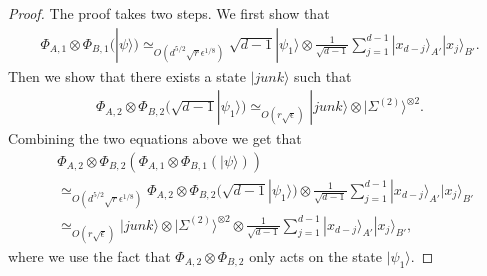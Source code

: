 \documentclass[11pt,letterpaper]{article}
\newcommand{\ket}[1]{|#1\rangle}
\newcommand{\x}{\otimes}
\newcommand{\1}{\mathbb{1}}
\newcommand{\EPR}[1]{\Sigma^{(#1)}}
\newcommand{\ep}{\epsilon}
\newcommand{\se}{\sqrt{\epsilon}}
\newcommand{\sr}{\sqrt{r}}
\newcommand{\appd}[1]{\simeq_{#1}}
\theoremstyle{definition}
\begin{document}
\begin{proof}
The proof takes two steps. 
We first show that 
\begin{align}
	\Phi_{A,1}\x\Phi_{B,1}(\ket{\psi}) \appd{O(d^{5/2} \sr \ep^{1/8})} \sqrt{d-1}\ket{\psi_1} \x \frac{1}{\sqrt{d-1}}\sum_{j=1}^{d-1} \ket{x_{d-j}}_{A'}\ket{x_j}_{B'}.
\end{align}
Then we show that there exists a state $\ket{junk}$ such that  
\begin{align}
\label{eq:phi2_result}
\Phi_{A,2} \x \Phi_{B,2} (\sqrt{d-1}\ket{\psi_1}) \appd{O(r\se)} \ket{junk} \x \ket{\EPR{2}}^{\x 2}.
\end{align}
Combining the two equations above we get that 
\begin{align}
	&\Phi_{A,2} \x \Phi_{B,2}( \Phi_{A,1} \x \Phi_{B,1} (\ket{\psi})) \\
	&\appd{O(d^{5/2} \sr \ep^{1/8})} \Phi_{A,2} \x \Phi_{B,2}(\sqrt{d-1} \ket{\psi_1}) \x\frac{1}{\sqrt{d-1}}\sum_{j=1}^{d-1} \ket{x_{d-j}}_{A'}\ket{x_j}_{B'} \\
	&\appd{O(r\se)} \ket{junk} \x \ket{\EPR{2}}^{\x 2} \x\frac{1}{\sqrt{d-1}}\sum_{j=1}^{d-1} \ket{x_{d-j}}_{A'}\ket{x_j}_{B'},
\end{align}
where we use the fact that $\Phi_{A,2}\x \Phi_{B,2}$ only acts on the state $\ket{\psi_1}$.


\end{proof}
\end{document}
